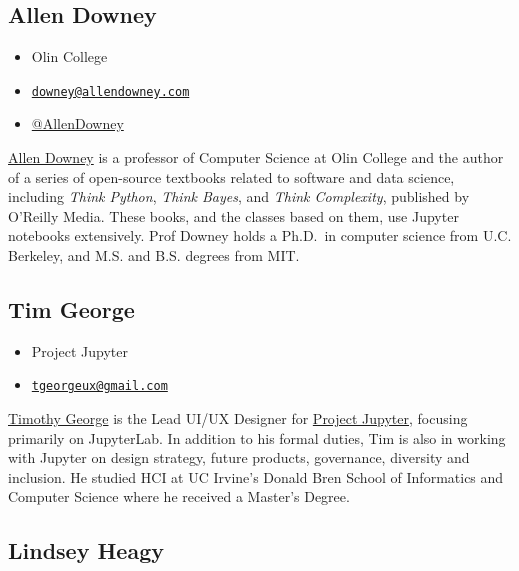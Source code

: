 \documentclass[]{book}
\providecommand{\tightlist}{%
  \setlength{\itemsep}{0pt}\setlength{\parskip}{0pt}}
\begin{document}
\subsection*{Allen Downey}\label{allen-downey}

\begin{itemize}
\tightlist
\item
  Olin College
\item
  \href{mailto:downey@allendowney.com}{\nolinkurl{downey@allendowney.com}}
\item
  \href{https://twitter.com/AllenDowney}{@AllenDowney}
\end{itemize}

\href{http://www.allendowney.com/wp/}{Allen Downey} is a professor of
Computer Science at Olin College and the author of a series of
open-source textbooks related to software and data science, including
\emph{Think Python}, \emph{Think Bayes}, and \emph{Think Complexity},
published by O'Reilly Media. These books, and the classes based on them,
use Jupyter notebooks extensively. Prof Downey holds a Ph.D.~in computer
science from U.C. Berkeley, and M.S. and B.S. degrees from MIT.

\subsection*{Tim George}\label{tim-george}

\begin{itemize}
\tightlist
\item
  Project Jupyter
\item
  \href{mailto:tgeorgeux@gmail.com}{\nolinkurl{tgeorgeux@gmail.com}}
\end{itemize}

\href{https://www.tgeorgeux.com/}{Timothy George} is the Lead UI/UX
Designer for \href{https://jupyter.org/}{Project Jupyter}, focusing
primarily on JupyterLab. In addition to his formal duties, Tim is also
in working with Jupyter on design strategy, future products, governance,
diversity and inclusion. He studied HCI at UC Irvine's Donald Bren
School of Informatics and Computer Science where he received a Master's
Degree.

\subsection*{Lindsey Heagy}\label{lindsey-heagy}
\end{document}
